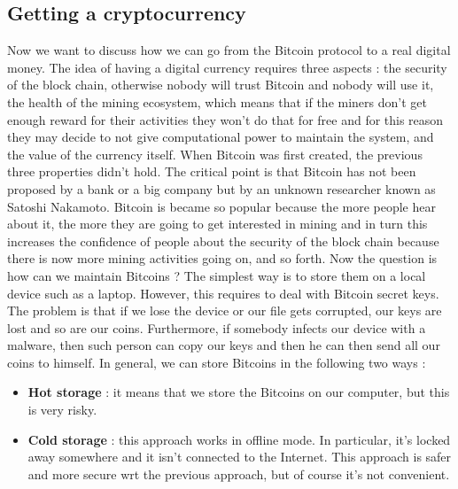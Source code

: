 \subsection{Getting a cryptocurrency}
Now we want to discuss how we can go from the Bitcoin protocol to a real digital money. The idea of having a digital currency requires three aspects : the security of the block chain, otherwise nobody will trust Bitcoin and nobody will use it, the health of the mining ecosystem, which means that if the miners don't get enough reward for their activities they won't do that for free and for this reason they may decide to not give computational power to maintain the system, and the value of the currency itself. When Bitcoin was first created, the previous three properties didn't hold. The critical point is that Bitcoin has not been proposed by a bank or a big company but by an unknown researcher known as Satoshi Nakamoto. Bitcoin is became so popular because the more people hear about it, the more they are going to get interested in mining and in turn this increases the confidence of people about the security of the block chain because there is now more mining activities going on, and so forth. Now the question is how can we maintain Bitcoins ? The simplest way is to store them on a local device such as a laptop. However, this requires to deal with Bitcoin secret keys. The problem is that if we lose the device or our file gets corrupted, our keys are lost and so are our coins. Furthermore, if somebody infects our device with a malware, then such person can copy our keys and then he can then send all our coins to himself. In general, we can store Bitcoins in the following two ways :
\begin{itemize}
\item \textbf{Hot storage} : it means that we store the Bitcoins on our computer, but this is very risky.
\item \textbf{Cold storage} : this approach works in offline mode. In particular, it's locked away somewhere and it isn't connected to the Internet. This approach is safer and more secure wrt the previous approach, but of course it's not convenient.
\end{itemize}
